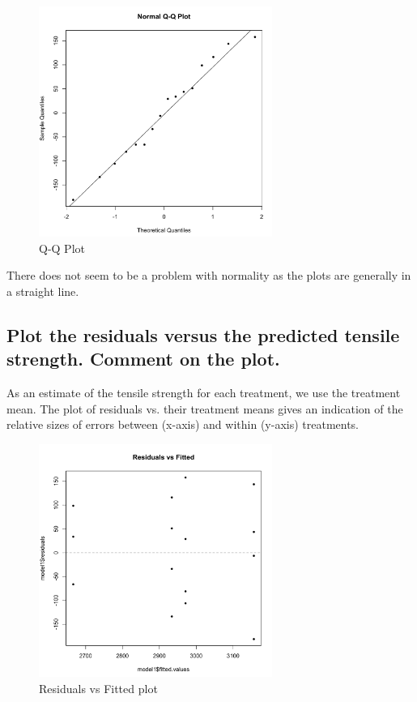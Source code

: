 \documentclass[11pt]{article}
\begin{document}
\begin{figure}[H]
    \centering
    \includegraphics[width=3.0in]{../pictures/hw2_q1_qqplot.png}
    \caption{Q-Q Plot}
    \label{Q-Q Plot}
\end{figure}

There does not seem to be a problem with normality as the plots are generally in a straight line.

\subsection{Plot the residuals versus the predicted tensile strength. Comment on the plot.}

As an estimate of the tensile strength for each treatment, we use the treatment mean. The plot of residuals vs. their treatment means gives an indication of the relative sizes of errors between (x-axis) and within (y-axis) treatments. 

\begin{figure}[H]
    \centering
    \includegraphics[width=3.0in]{../pictures/hw2_q1_pf.png}
    \caption{Residuals vs Fitted plot}
    \label{Residuals vs Fitted plot}
\end{figure}
\end{document}
